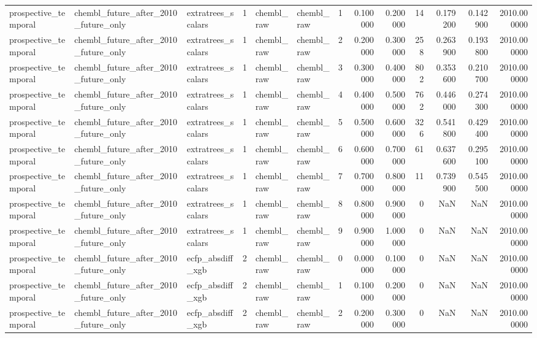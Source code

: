 \begin{longtable}{lllrllrrrrrrr}
prospective\_temporal & chembl\_future\_after\_2010\_future\_only & extratrees\_scalars & 1 & chembl\_raw & chembl\_raw & 1 & 0.100000 & 0.200000 & 14 & 0.179200 & 0.142900 & 2010.000000 \\
prospective\_temporal & chembl\_future\_after\_2010\_future\_only & extratrees\_scalars & 1 & chembl\_raw & chembl\_raw & 2 & 0.200000 & 0.300000 & 258 & 0.263900 & 0.193800 & 2010.000000 \\
prospective\_temporal & chembl\_future\_after\_2010\_future\_only & extratrees\_scalars & 1 & chembl\_raw & chembl\_raw & 3 & 0.300000 & 0.400000 & 802 & 0.353600 & 0.210700 & 2010.000000 \\
prospective\_temporal & chembl\_future\_after\_2010\_future\_only & extratrees\_scalars & 1 & chembl\_raw & chembl\_raw & 4 & 0.400000 & 0.500000 & 762 & 0.446000 & 0.274300 & 2010.000000 \\
prospective\_temporal & chembl\_future\_after\_2010\_future\_only & extratrees\_scalars & 1 & chembl\_raw & chembl\_raw & 5 & 0.500000 & 0.600000 & 326 & 0.541800 & 0.429400 & 2010.000000 \\
prospective\_temporal & chembl\_future\_after\_2010\_future\_only & extratrees\_scalars & 1 & chembl\_raw & chembl\_raw & 6 & 0.600000 & 0.700000 & 61 & 0.637600 & 0.295100 & 2010.000000 \\
prospective\_temporal & chembl\_future\_after\_2010\_future\_only & extratrees\_scalars & 1 & chembl\_raw & chembl\_raw & 7 & 0.700000 & 0.800000 & 11 & 0.739900 & 0.545500 & 2010.000000 \\
prospective\_temporal & chembl\_future\_after\_2010\_future\_only & extratrees\_scalars & 1 & chembl\_raw & chembl\_raw & 8 & 0.800000 & 0.900000 & 0 & NaN & NaN & 2010.000000 \\
prospective\_temporal & chembl\_future\_after\_2010\_future\_only & extratrees\_scalars & 1 & chembl\_raw & chembl\_raw & 9 & 0.900000 & 1.000000 & 0 & NaN & NaN & 2010.000000 \\
prospective\_temporal & chembl\_future\_after\_2010\_future\_only & ecfp\_absdiff\_xgb & 2 & chembl\_raw & chembl\_raw & 0 & 0.000000 & 0.100000 & 0 & NaN & NaN & 2010.000000 \\
prospective\_temporal & chembl\_future\_after\_2010\_future\_only & ecfp\_absdiff\_xgb & 2 & chembl\_raw & chembl\_raw & 1 & 0.100000 & 0.200000 & 0 & NaN & NaN & 2010.000000 \\
prospective\_temporal & chembl\_future\_after\_2010\_future\_only & ecfp\_absdiff\_xgb & 2 & chembl\_raw & chembl\_raw & 2 & 0.200000 & 0.300000 & 0 & NaN & NaN & 2010.000000 \\

\end{longtable}
